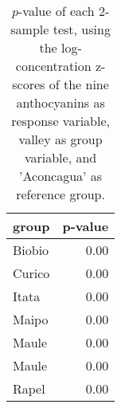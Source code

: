 \begin{table}[ht]
\centering
\begin{tabular}{lr}
  \hline
group & p-value \\ 
  \hline
Biobio & 0.00 \\ 
  Curico & 0.00 \\ 
  Itata & 0.00 \\ 
  Maipo & 0.00 \\ 
  Maule & 0.00 \\ 
  Maule  & 0.00 \\ 
  Rapel & 0.00 \\ 
   \hline
\end{tabular}
\caption{
            $p$-value of each 2-sample test, using the log-concentration 
            z-scores of the nine anthocyanins as response variable, 
            valley as group variable, and 'Aconcagua' 
            as reference group.
        } 
\label{tbl:2}
\end{table}
